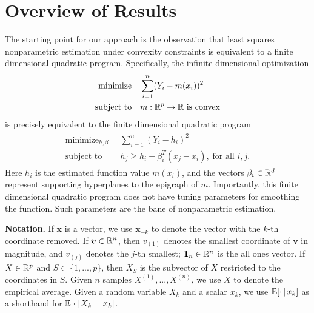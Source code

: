 \section{Overview of Results}

The starting point for our approach is the observation that least squares
nonparametric estimation under convexity constraints is equivalent to
a finite dimensional quadratic program.  Specifically, the infinite
dimensional optimization 
\begin{align}
\begin{split}
\text{minimize} & \quad \sum_{i=1}^n (Y_i - m(x_i))^2 \\
\text{subject to} &  \quad m:{\mathbb R}^p\rightarrow{\mathbb R}\ \text{is
  convex}
\end{split}
\end{align}
is precisely equivalent to the finite dimensional quadratic
program 
\begin{align}
\begin{split}
\label{eq:outer}
\text{minimize}_{h, \beta} & \;\; \sum_{i=1}^n (Y_i - h_i)^2 \\
\text{subject to} & \;\; h_j \geq h_i + \beta_i^T (x_j-x_i),\; \text{for
    all $i,j$}.
\end{split}
\end{align}
Here $h_i$ is the estimated function value $m(x_i)$, and the vectors
$\beta_i \in {\mathbb R}^d$ represent supporting hyperplanes to the
epigraph of $m$.  Importantly, this finite dimensional quadratic program does
not have tuning parameters for smoothing the function. Such parameters are the bane
of nonparametric estimation.


\textbf{Notation.} If
$\mathbf{x}$ is a vector, we use $\mathbf{x}_{-k}$ to denote the
vector with the $k$-th coordinate removed. If $\mbox{\boldmath $v$} \in {\mathbb R}^n$, then
$v_{(1)}$ denotes the smallest coordinate of $\mathbf{v}$ in
magnitude, and $v_{(j)}$ denotes the $j$-th smallest; $\mbox{\boldmath $1$}_n \in {\mathbb R}^n$
is the all ones vector. If $X \in {\mathbb R}^p$ and $S \subset
\{1,...,p\}$, then $X_S$ is the subvector of $X$ restricted to
the coordinates in $S$. Given $n$ samples $X^{(1)},...,X^{(n)}$, we use
$\bar{X}$ to denote the empirical average. Given a random variable $X_k$ and a scalar $x_k$, we use ${\mathbb E}[\cdot {\,|\,} x_k]$ as a shorthand for ${\mathbb E}[ \cdot {\,|\,} X_k = x_k]$.


